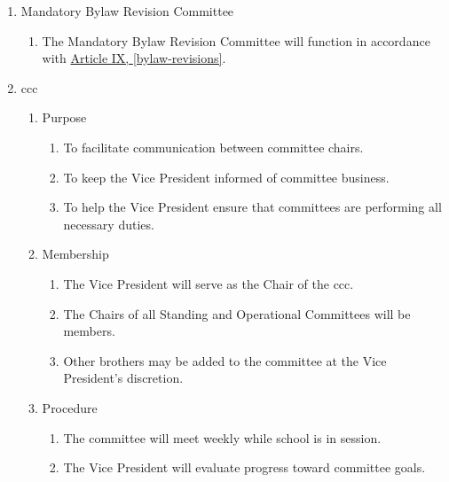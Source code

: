 \begin{enumerate}
\begin{enumerate}
\begin{enumerate}
					\item Procedure
						\begin{enumerate}
							\item The committee will be created and convened during the budgeting process outlined in \hyperref[budget]{Article VI, \autoref*{budget}}.
							\item The committee may meet at other times to examine the finances of the chapter at the direction of \gls{ec}.
						\end{enumerate}
				\end{enumerate}

			\item Mandatory Bylaw Revision Committee
				\begin{enumerate}
					\item The Mandatory Bylaw Revision Committee will function in accordance with \hyperref[bylaw-revisions]{Article IX, \autoref*{bylaw-revisions}}.
				\end{enumerate}



			\item \gls{ccc}
				\begin{enumerate}
					\item Purpose
						\begin{enumerate}
							\item To facilitate communication between committee chairs.
							\item To keep the Vice President informed of committee business.
							\item To help the Vice President ensure that committees are performing all necessary duties.
						\end{enumerate}
					\item Membership
						\begin{enumerate}
							\item The Vice President will serve as the Chair of the \gls{ccc}.
							\item The Chairs of all Standing and Operational Committees will be members.
							\item Other brothers may be added to the committee at the Vice President's discretion.
						\end{enumerate}
					\item Procedure
						\begin{enumerate}
							\item The committee will meet weekly while school is in session.
							\item The Vice President will evaluate progress toward committee goals.
						\end{enumerate}
				\end{enumerate}


\end{enumerate}
\end{enumerate}
